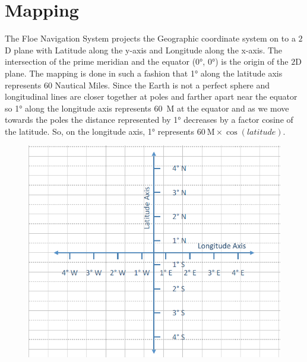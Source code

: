 \section{Mapping}
\label{sec:sec4_2}
\noindent
%
The Floe Navigation System projects the Geographic coordinate system on to a $2$D plane with Latitude along the y-axis and Longitude along the x-axis. The intersection of the prime meridian and the equator (\ang{0}, \ang{0}) is the origin of the $2$D plane. The mapping is done in such a fashion that \ang{1} along the latitude axis represents $60$ Nautical Miles. Since the Earth is not a perfect sphere and longitudinal lines are closer together at poles and farther apart near the equator so \ang{1} along the longitude axis represents \SI{60}{\nauticalmile} at the equator and as we move towards the poles the distance represented by \ang{1} decreases by a factor cosine of the latitude. So, on the longitude axis, \ang{1} represents $\SI{60}{\nauticalmile} \times \cos(latitude)$.
\begin{figure}[h]
	\centering
	\includegraphics[height=0.45\textheight]{fig04/2DProject}
	\label{fig:CH4MapProjection}
\end{figure}
%
